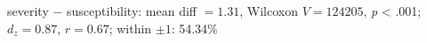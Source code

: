 severity $-$ susceptibility: mean diff $=1.31$, Wilcoxon $V=124205$, \textit{p} < .001; $d_z=0.87$, $r=0.67$; within $\pm 1$: 54.34\%%
